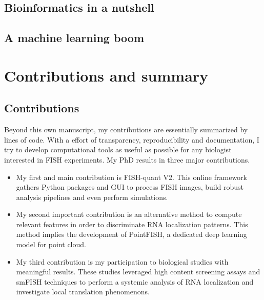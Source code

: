 \subsection{Bioinformatics in a nutshell}
\label{subsec:intro_non_ml_tools}

\subsection{A machine learning boom}
\label{subsec:intro_ml_tools}


\section{Contributions and summary}
\label{sec:contributions}

\subsection{Contributions}
\label{subsec:intro_contributions}

Beyond this own manuscript, my contributions are essentially summarized by lines of code.
With a effort of transparency, reproducibility and documentation, I try to develop computational tools as useful as possible for any biologist interested in \ac{FISH} experiments.
My PhD results in three major contributions.

\begin{itemize}
	\setlength\itemsep{0.1em}
	\item My first and main contribution is FISH-quant V2.
	This online framework gathers Python packages and \ac{GUI} to process \ac{FISH} images, build robust analysis pipelines and even perform simulations.
	\item My second important contribution is an alternative method to compute relevant features in order to discriminate \ac{RNA} localization patterns.
	This method implies the development of PointFISH, a dedicated deep learning model for point cloud.
	\item My third contribution is my participation to biological studies with meaningful results.
	These studies leveraged high content screening assays and \ac{smFISH} techniques to perform a systemic analysis of \ac{RNA} localization and investigate local translation phenomenons.
\end{itemize}

